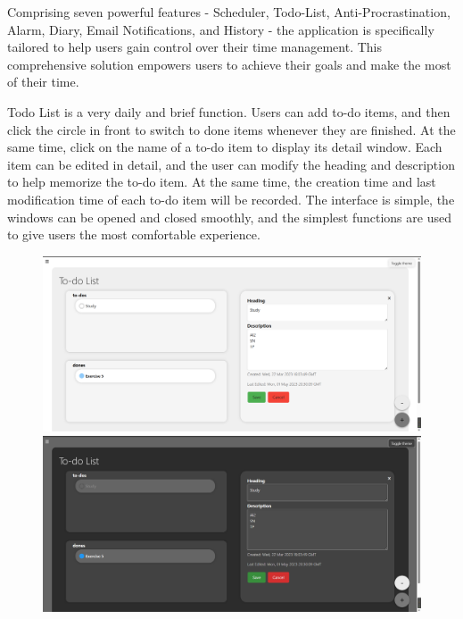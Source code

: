 \documentclass[a4paper]{article}
\begin{document}
Comprising seven powerful features - Scheduler, Todo-List, Anti-Procrastination, Alarm, Diary, Email Notifications, and History - the application is specifically tailored to help users gain control over their time management. This comprehensive solution empowers users to achieve their goals and make the most of their time.

Todo List is a very daily and brief function. Users can add to-do items, and then click the circle in front to switch to done items whenever they are finished. At the same time, click on the name of a to-do item to display its detail window. Each item can be edited in detail, and the user can modify the heading and description to help memorize the to-do item. At the same time, the creation time and last modification time of each to-do item will be recorded. The interface is simple, the windows can be opened and closed smoothly, and the simplest functions are used to give users the most comfortable experience.

\begin{figure}[H]
    \centering
    \begin{minipage}{0.49\textwidth}
      \centering
      \includegraphics[width=\linewidth]{./image/Todo_list_light.png}
    \end{minipage}\hfill
    \begin{minipage}{0.49\textwidth}
      \centering
      \includegraphics[width=\linewidth]{./image/Todo_list_dark.png}
    \end{minipage}
\end{figure}
\end{document}
